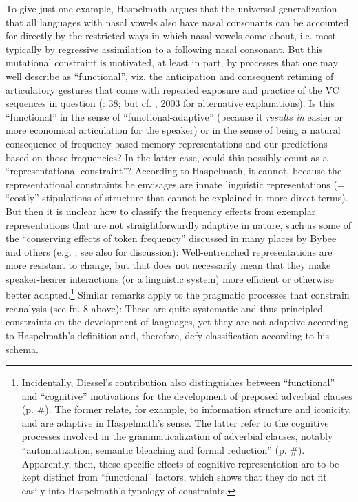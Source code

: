 \documentclass[output=paper]{langsci/langscibook}
\begin{document}
To give just one example, Haspelmath argues that the universal generalization that all languages with nasal vowels also have nasal consonants can be accounted for directly by the restricted ways in which nasal vowels come about, i.e. most typically by regressive assimilation to a following nasal consonant. But this mutational constraint is motivated, at least in part, by processes that one may well describe as “functional”, viz. the anticipation and consequent retiming of articulatory gestures that come with repeated exposure and practice of the VC sequences in question (\citealt{Bybee2015}: 38; but cf. \citealt{Ohala1989}, 2003 for alternative explanations). Is this “functional” in the sense of “functional-adaptive” (because it \textit{results} \textit{in} easier or more economical articulation for the speaker) or in the sense of being a natural consequence of frequency-based memory representations and our predictions based on those frequencies? In the latter case, could this possibly count as a “representational constraint”? According to Haspelmath, it cannot, because the representational constraints he envisages are innate linguistic representations (= “costly” stipulations of structure that cannot be explained in more direct terms). But then it is unclear how to classify the frequency effects from exemplar representations that are not straightforwardly adaptive in nature, such as some of the “conserving effects of token frequency” discussed in many places by Bybee and others (e.g. \citealt{BybeeThompson1997,Pierrehumbert2001,Bybee2001}; see also \citealt{Cristofaro2015} for discussion): Well-entrenched representations are more resistant to change, but that does not necessarily mean that they make speaker-hearer interactions (or a linguistic system) more efficient or otherwise better adapted.\footnote{Incidentally, Diessel’s contribution also distinguishes between “functional” and “cognitive” motivations for the development of preposed adverbial clauses (p. \#). The former relate, for example, to information structure and iconicity, and are adaptive in Haspelmath’s sense. The latter refer to the cognitive processes involved in the grammaticalization of adverbial clauses, notably “automatization, semantic bleaching and formal reduction” (p. \#). Apparently, then, these specific effects of cognitive representation are to be kept distinct from “functional” factors, which shows that they do not fit easily into Haspelmath’s typology of constraints.}  Similar remarks apply to the pragmatic processes that constrain reanalysis (see fn. 8 above): These are quite systematic and thus principled constraints on the development of languages, yet they are not adaptive according to Haspelmath’s definition and, therefore, defy classification according to his schema.
\end{document}
